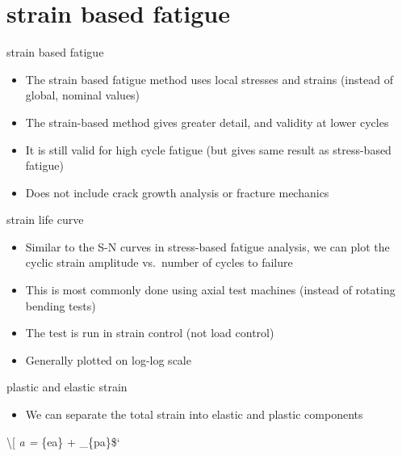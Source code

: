 \documentclass[
  letterpaper,
  ignorenonframetext,
  aspectratio=43,
  handout,
  12pt]{beamer}
\providecommand{\tightlist}{%
  \setlength{\itemsep}{0pt}\setlength{\parskip}{0pt}}
\providecommand{\tightlist}{%
\setlength{\itemsep}{0pt}\setlength{\parskip}{0pt}}
\begin{document}
\hypertarget{strain-based-fatigue}{%
\section{strain based fatigue}\label{strain-based-fatigue}}

\begin{frame}{strain based fatigue}
\protect\hypertarget{strain-based-fatigue-1}{}
\begin{itemize}
\tightlist
\item
  The strain based fatigue method uses local stresses and strains
  (instead of global, nominal values)
\item
  The strain-based method gives greater detail, and validity at lower
  cycles
\item
  It is still valid for high cycle fatigue (but gives same result as
  stress-based fatigue)
\item
  Does not include crack growth analysis or fracture mechanics
\end{itemize}
\end{frame}

\begin{frame}{strain life curve}
\protect\hypertarget{strain-life-curve}{}
\begin{itemize}
\tightlist
\item
  Similar to the S-N curves in stress-based fatigue analysis, we can
  plot the cyclic strain amplitude vs.~number of cycles to failure
\item
  This is most commonly done using axial test machines (instead of
  rotating bending tests)
\item
  The test is run in strain control (not load control)
\item
  Generally plotted on log-log scale
\end{itemize}
\end{frame}

\begin{frame}{plastic and elastic strain}
\protect\hypertarget{plastic-and-elastic-strain}{}
\begin{itemize}
\tightlist
\item
  We can separate the total strain into elastic and plastic components
\end{itemize}

\textbackslash{[} \epsilon\emph{a = \epsilon}\{ea\} +
\epsilon\_\{pa\}\$`
\end{frame}
\end{document}
